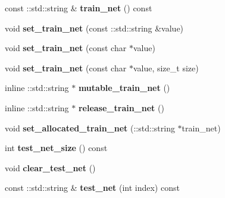 \begin{DoxyCompactItemize}
const \+::std\+::string \& {\bfseries train\+\_\+net} () const
\item 
\mbox{\label{classcaffe_1_1_solver_parameter_a804bd85fcd2d79702aa0256423869454}} 
void {\bfseries set\+\_\+train\+\_\+net} (const \+::std\+::string \&value)
\item 
\mbox{\label{classcaffe_1_1_solver_parameter_a719a4be316395509113565db53758b10}} 
void {\bfseries set\+\_\+train\+\_\+net} (const char $\ast$value)
\item 
\mbox{\label{classcaffe_1_1_solver_parameter_adf490bd3a9e0b4aebb0bcfed5ff85ba4}} 
void {\bfseries set\+\_\+train\+\_\+net} (const char $\ast$value, size\+\_\+t size)
\item 
\mbox{\label{classcaffe_1_1_solver_parameter_a0f049e38a4f90c0c716305b7be948c69}} 
inline \+::std\+::string $\ast$ {\bfseries mutable\+\_\+train\+\_\+net} ()
\item 
\mbox{\label{classcaffe_1_1_solver_parameter_a38a514825510ba2954785efcf3cf245d}} 
inline \+::std\+::string $\ast$ {\bfseries release\+\_\+train\+\_\+net} ()
\item 
\mbox{\label{classcaffe_1_1_solver_parameter_aab702123374ec943e5ea07c7afffb317}} 
void {\bfseries set\+\_\+allocated\+\_\+train\+\_\+net} (\+::std\+::string $\ast$train\+\_\+net)
\item 
\mbox{\label{classcaffe_1_1_solver_parameter_a0e58511440aec5b432ee82b2ca88e25a}} 
int {\bfseries test\+\_\+net\+\_\+size} () const
\item 
\mbox{\label{classcaffe_1_1_solver_parameter_a41be218caf016dc1f55a87d812c247f1}} 
void {\bfseries clear\+\_\+test\+\_\+net} ()
\item 
\mbox{\label{classcaffe_1_1_solver_parameter_a55a35e2596c07dcfa231c38d427ba724}} 
const \+::std\+::string \& {\bfseries test\+\_\+net} (int index) const
\item 

\end{DoxyCompactItemize}
